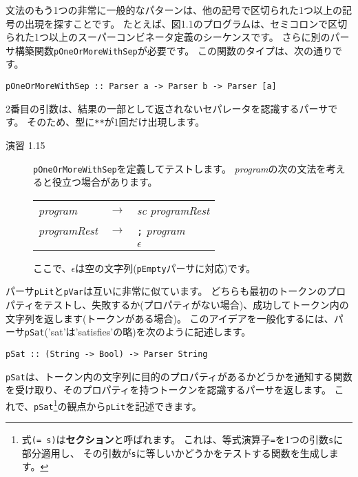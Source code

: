 \documentclass{jarticle}
\begin{document}
文法のもう1つの非常に一般的なパターンは、他の記号で区切られた1つ以上の記号の出現を探すことです。
たとえば、図1.1のプログラムは、セミコロンで区切られた1つ以上のスーパーコンビネータ定義のシーケンスです。
さらに別のパーサ構築関数\texttt{pOneOrMoreWithSep}が必要です。
この関数のタイプは、次の通りです。
\begin{verbatim}
pOneOrMoreWithSep :: Parser a -> Parser b -> Parser [a]
\end{verbatim}
2番目の引数は、結果の一部として返されないセパレータを認識するパーサです。
そのため、型に\texttt{**}が1回だけ出現します。

\begin{description}
	\item[演習 1.15] \texttt{pOneOrMoreWithSep}を定義してテストします。
	      \textit{program}の次の文法を考えると役立つ場合があります。

	      \begin{center}
		      \begin{tabular} {l c l}
			      \textit{program}     & $\rightarrow$ & \textit{sc} \textit{programRest} \\
			      \textit{programRest} & $\rightarrow$ & \texttt{;} \textit{program}      \\
			                           & \textbar      & $\epsilon$
		      \end{tabular}
	      \end{center}

	      ここで、$\epsilon$は空の文字列(\texttt{pEmpty}パーサに対応)です。
\end{description}

パーサ\texttt{pLit}と\texttt{pVar}は互いに非常に似ています。
どちらも最初のトークンのプロパティをテストし、失敗するか(プロパティがない場合)、成功してトークン内の文字列を返します(トークンがある場合)。
このアイデアを一般化するには、パーサ\texttt{pSat}('sat'は'satisfies'の略)を次のように記述します。

\begin{verbatim}
pSat :: (String -> Bool) -> Parser String
\end{verbatim}

\texttt{pSat}は、トークン内の文字列に目的のプロパティがあるかどうかを通知する関数を受け取り、そのプロパティを持つトークンを認識するパーサを返します。
これで、\texttt{pSat}\footnote{式\texttt{(= s)}は\textbf{セクション}と呼ばれます。
	これは、等式演算子\texttt{=}を1つの引数\texttt{s}に部分適用し、
	その引数が\texttt{s}に等しいかどうかをテストする関数を生成します。}の観点から\texttt{pLit}を記述できます。
\end{document}
